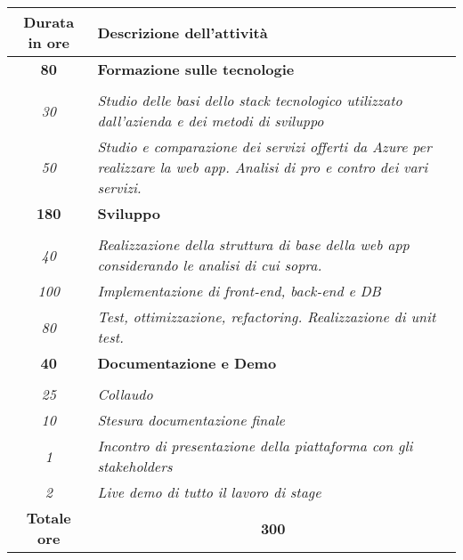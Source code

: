 

\begin{tabularx}{\textwidth}{|c|X|}
	\hline
	\textbf{Durata in ore} & \textbf{Descrizione dell'attività} \\\hline
	
	\textbf{80} & \textbf{Formazione sulle tecnologie} \\ \hdashline
        \multirow{2}{0cm}\\
            \textit{30} &
            \textit{Studio delle basi dello stack tecnologico utilizzato dall'azienda e dei metodi di sviluppo} \\
            \textit{50} &
            \textit{Studio e comparazione dei servizi offerti da Azure per realizzare la web app. Analisi di pro e contro dei vari servizi.} \\
    \hline
    
    \textbf{180} & \textbf{Sviluppo} \\ \hdashline 
    \multirow{3}{0cm}\\ 
    \textit{40} & 
    \textit{Realizzazione della struttura di base della web app considerando le analisi di cui sopra.} \\
    \textit{100} & 
    \textit{Implementazione di front-end, back-end e DB} \\
    \textit{80} & 
    \textit{Test, ottimizzazione, refactoring. Realizzazione di unit test.} \\
    \hline
    
    \textbf{40} & \textbf{Documentazione e Demo}  \\ \hdashline 
    \multirow{4}{0cm}\\ 
    \textit{25} & 
    \textit{Collaudo} \\
    \textit{10} & 
    \textit{Stesura documentazione finale} \\
    \textit{1} & 
    \textit{Incontro di presentazione della piattaforma con gli stakeholders} \\
    \textit{2} & 
    \textit{Live demo di tutto il lavoro di stage} \\
    \hline
	
	\textbf{Totale ore} & \multicolumn{1}{|c|}{\textbf{300}} \\\hline
	
	
\end{tabularx}
